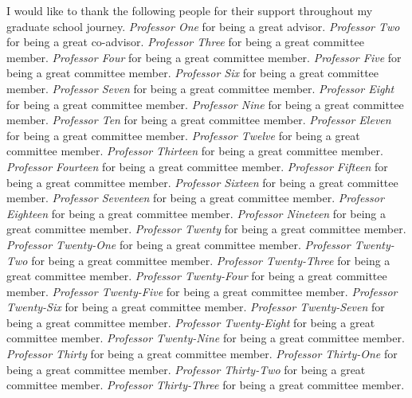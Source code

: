 \documentclass[11pt]{formatting-template}
\begin{document}
\begin{acknowledgements}
	I would like to thank the following people for their support throughout my graduate school journey. \textit{Professor One} for being a great advisor. \textit{Professor Two} for being a great co-advisor. \textit{Professor Three} for being a great committee member. \textit{Professor Four} for being a great committee member. \textit{Professor Five} for being a great committee member. \textit{Professor Six} for being a great committee member. \textit{Professor Seven} for being a great committee member. \textit{Professor Eight} for being a great committee member. \textit{Professor Nine} for being a great committee member. \textit{Professor Ten} for being a great committee member. \textit{Professor Eleven} for being a great committee member. \textit{Professor Twelve} for being a great committee member. \textit{Professor Thirteen} for being a great committee member. \textit{Professor Fourteen} for being a great committee member. \textit{Professor Fifteen} for being a great committee member. \textit{Professor Sixteen} for being a great committee member. \textit{Professor Seventeen} for being a great committee member. \textit{Professor Eighteen} for being a great committee member. \textit{Professor Nineteen} for being a great committee member. \textit{Professor Twenty} for being a great committee member. \textit{Professor Twenty-One} for being a great committee member. \textit{Professor Twenty-Two} for being a great committee member. \textit{Professor Twenty-Three} for being a great committee member. \textit{Professor Twenty-Four} for being a great committee member. \textit{Professor Twenty-Five} for being a great committee member. \textit{Professor Twenty-Six} for being a great committee member. \textit{Professor Twenty-Seven} for being a great committee member. \textit{Professor Twenty-Eight} for being a great committee member. \textit{Professor Twenty-Nine} for being a great committee member. \textit{Professor Thirty} for being a great committee member. \textit{Professor Thirty-One} for being a great committee member. \textit{Professor Thirty-Two} for being a great committee member. \textit{Professor Thirty-Three} for being a great committee member.
\end{acknowledgements}
\end{document}
